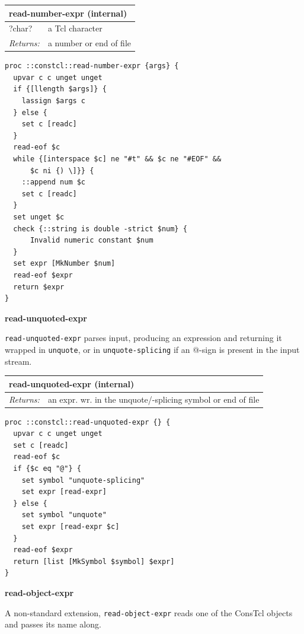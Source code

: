 \documentclass[twoside,9pt]{report}
\begin{document}
\begin{tabular}{ |l l| }
\hline
\multicolumn{2}{|l|}{read-number-expr (internal)} \\
\hline
?char? & a Tcl character \\
\textit{Returns:} & a number or end of file \\
\hline
\end{tabular}

\noindent\makebox[\linewidth]{\rule{\linewidth}{0.4pt}}
\begin{lstlisting}
proc ::constcl::read-number-expr {args} {
  upvar c c unget unget
  if {[llength $args]} {
    lassign $args c
  } else {
    set c [readc]
  }
  read-eof $c
  while {[interspace $c] ne "#t" && $c ne "#EOF" &&
      $c ni {) \]}} {
    ::append num $c
    set c [readc]
  }
  set unget $c
  check {::string is double -strict $num} {
      Invalid numeric constant $num
  }
  set expr [MkNumber $num]
  read-eof $expr
  return $expr
}
\end{lstlisting}
\noindent\makebox[\linewidth]{\rule{\linewidth}{0.4pt}}

\textbf{read-unquoted-expr}


\texttt{read-unquoted-expr} parses input, producing an expression and returning it wrapped in \texttt{unquote}, or in \texttt{unquote-splicing} if an @-sign is present in the input stream.

\begin{tabular}{ |l l| }
\hline
\multicolumn{2}{|l|}{read-unquoted-expr (internal)} \\
\hline
\textit{Returns:} & an expr. wr. in the unquote/-splicing symbol or end of file \\
\hline
\end{tabular}

\noindent\makebox[\linewidth]{\rule{\linewidth}{0.4pt}}
\begin{lstlisting}
proc ::constcl::read-unquoted-expr {} {
  upvar c c unget unget
  set c [readc]
  read-eof $c
  if {$c eq "@"} {
    set symbol "unquote-splicing"
    set expr [read-expr]
  } else {
    set symbol "unquote"
    set expr [read-expr $c]
  }
  read-eof $expr
  return [list [MkSymbol $symbol] $expr]
}
\end{lstlisting}
\noindent\makebox[\linewidth]{\rule{\linewidth}{0.4pt}}

\textbf{read-object-expr}


A non-standard extension, \texttt{read-object-expr} reads one of the ConsTcl objects and passes its name along.
\end{document}
